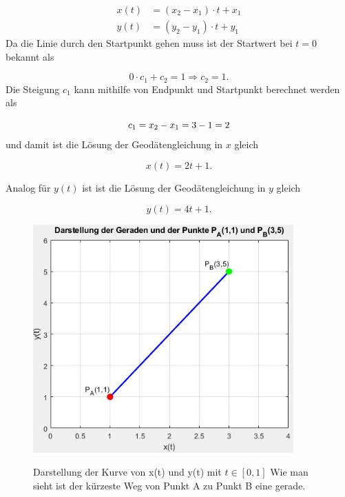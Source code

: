 \begin{align}
	x(t) &= (x_2 - x_1) \cdot t + x_1 \\
	y(t) &= (y_2 - y_1) \cdot t + y_1
\end{align}
Da die Linie durch den Startpunkt gehen muss ist der Startwert bei $t=0$ bekannt als
 
\begin{equation}
	0 \cdot c_1 + c_2 = 1 \Rightarrow c_2 = 1 .	
\end{equation}
Die Steigung $c_1$ kann mithilfe von Endpunkt und Startpunkt berechnet werden als

\begin{equation}
	c_1 = x_2 - x_1 \\ = 3-1 \\ = 2
\end{equation}
und damit ist die Lösung der Geodätengleichung in $x$ gleich

\begin{equation}
	x(t) = 2t + 1 .
	\label{geodaeten:equation:StaKartesisch:LoesungX}
\end{equation}

Analog für $y(t)$ ist ist die Lösung der Geodätengleichung in $y$ gleich

\begin{equation}
	y(t) = 4t + 1 .
	\label{geodaeten:equation:StaKartesisch:LoesungX}
\end{equation}

\begin{figure}
	\centering
	\includegraphics[width=10cm]{papers/geodaeten/Abbildungen/Standardverfahren/Kartesisch}
	\label{geodaeten:figure:Standardverfahren:Kartesisch:figure1}
	\caption{Darstellung der Kurve von x(t) und y(t) mit $t \in [0 , 1]$ Wie man sieht ist der kürzeste Weg von Punkt A zu Punkt B eine gerade.}
\end{figure}
